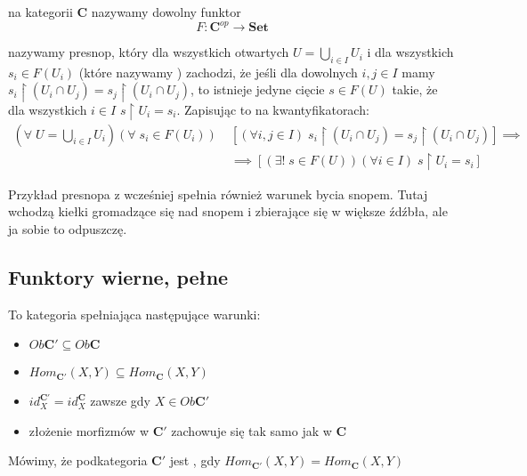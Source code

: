 \begin{definition}
   na kategorii $\mathbf{C}$ nazywamy dowolny funktor
  $$F:\mathbf{C}^{op}\to\mathbf{Set}$$

   nazywamy presnop, który dla wszystkich otwartych $U=\bigcup_{i\in I} U_i$ i dla wszystkich $s_i\in F(U_i)$ (które nazywamy ) zachodzi, że jeśli dla dowolnych $i,j\in I$ mamy $s_i\restriction (U_i\cap U_j)=s_j\restriction(U_i\cap U_j)$, to istnieje jedyne cięcie $s\in F(U)$ takie, że dla wszystkich $i\in I$ $s\restriction U_i=s_i$. Zapisując to na kwantyfikatorach:
  \begin{align*}
    (\forall\;U=\bigcup_{i\in I}U_i)
    (\forall\;s_i\in F(U_i))\;
    &\left[ 
      (\forall i,j\in I)\;
      s_i\restriction(U_i\cap U_j)=s_j\restriction(U_i\cap U_j) 
    \right]
    \implies\\
    &\implies\left[
      (\exists!\;s\in F(U))
      (\forall i\in I)\;s\restriction U_i=s_i
    \right]
  \end{align*}
\end{definition}

\begin{example}
  \item Przykład presnopa z wcześniej spełnia również warunek bycia snopem. Tutaj wchodzą kiełki gromadzące się nad snopem i zbierające się w większe źdźbła, ale ja sobie to odpuszczę.
\end{example}

\subsection{Funktory wierne, pełne}

\begin{definition}
  To kategoria spełniająca następujące warunki:
  \begin{itemize}
    \item $Ob\mathbf{C}'\subseteq Ob\mathbf{C}$
    \item $Hom_{\mathbf{C}'}(X,Y)\subseteq Hom_{\mathbf{C}}(X, Y)$
    \item $id_X^{\mathbf{C}'}=id_X^{\mathbf{C}}$ zawsze gdy $X\in Ob\mathbf{C}'$
    \item złożenie morfizmów w $\mathbf{C}'$ zachowuje się tak samo jak w $\mathbf{C}$
  \end{itemize}

  Mówimy, że podkategoria $\mathbf{C}'$ jest , gdy $Hom_{\mathbf{C}'}(X,Y)=Hom_{\mathbf{C}}(X,Y)$
\end{definition}


